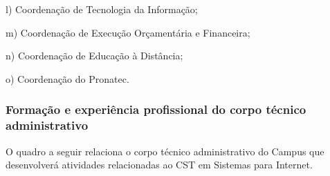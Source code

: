 l)      Coordena\c{c}\~ao de Tecnologia da Informa\c{c}\~ao;

m)      Coordena\c{c}\~ao de Execu\c{c}\~ao Or\c{c}ament\'aria e Financeira;

n)      Coordena\c{c}\~ao de Educa\c{c}\~ao \`a Dist\^ancia;

o)      Coordena\c{c}\~ao do Pronatec.


\subsubsection{Forma\c{c}\~ao e experi\^encia profissional do corpo t\'ecnico administrativo}


O quadro a seguir relaciona o corpo técnico administrativo do Campus que desenvolver\'a atividades relacionadas ao CST em Sistemas para Internet.
 
\newpage

